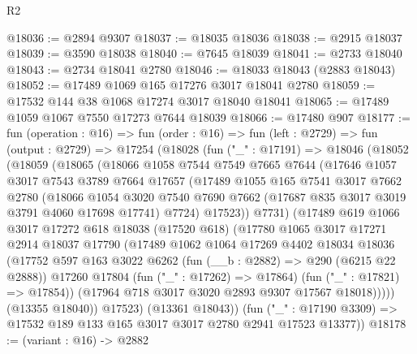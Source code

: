 \begin{lexlean}{R2}
\begin{coremodule}
@18036 := @2894 @9307
@18037 := @18035 @18036
@18038 := @2915 @18037
@18039 := @3590 @18038
@18040 := @7645 @18039
@18041 := @2733 @18040
@18043 := @2734 @18041 @2780
@18046 := @18033 @18043 (@2883 @18043)
@18052 := @17489 @1069 @165 @17276 @3017 @18041 @2780
@18059 := @17532 @144 @38 @1068 @17274 @3017 @18040 @18041
@18065 := @17489 @1059 @1067 @7550 @17273 @7644 @18039
@18066 := @17480 @907
@18177 := fun (operation : @16) =>
  fun (order : @16) =>
  fun (left : @2729) =>
  fun (output : @2729) =>
  @17254
    (@18028
      (fun ("_" : @17191) =>
      @18046
        (@18052
          (@18059
            (@18065
              (@18066
                @1058
                @7544
                @7549
                @7665
                @7644
                (@17646
                  @1057
                  @3017
                  @7543
                  @3789
                  @7664
                  @17657
                  (@17489
                    @1055
                    @165
                    @7541
                    @3017
                    @7662
                    @2780
                    (@18066
                      @1054
                      @3020
                      @7540
                      @7690
                      @7662
                      (@17687 @835 @3017 @3019 @3791 @4060 @17698 @17741)
                      @7724)
                    @17523))
                @7731)
              (@17489
                @619
                @1066
                @3017
                @17272
                @618
                @18038
                (@17520 @618)
                (@17780
                  @1065
                  @3017
                  @17271
                  @2914
                  @18037
                  @17790
                  (@17489
                    @1062
                    @1064
                    @17269
                    @4402
                    @18034
                    @18036
                    (@17752
                      @597
                      @163
                      @3022
                      @6262
                      (fun (__b : @2882) => @290 (@6215 @22 @2888))
                      @17260
                      @17804
                      (fun ("_" : @17262) => @17864)
                      (fun ("_" : @17821) => @17854))
                    (@17964 @718 @3017 @3020 @2893 @9307 @17567 @18018)))))
            (@13355 @18040))
          @17523)
        (@13361 @18043))
      (fun ("_" : @17190 @3309) => @17532 @189 @133 @165 @3017 @3017 @2780 @2941 @17523 @13377))
@18178 := (variant : @16) -> @2882

\end{coremodule}
\end{lexlean}
